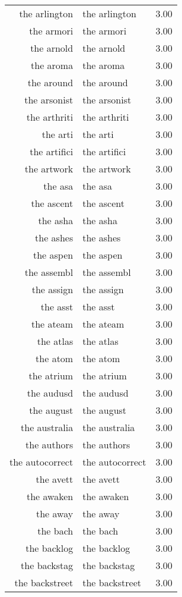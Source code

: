 \begin{table}[ht]
\begin{tabular}{rlr}
  the arlington & the arlington & 3.00 \\ 
  the armori & the armori & 3.00 \\ 
  the arnold & the arnold & 3.00 \\ 
  the aroma & the aroma & 3.00 \\ 
  the around & the around & 3.00 \\ 
  the arsonist & the arsonist & 3.00 \\ 
  the arthriti & the arthriti & 3.00 \\ 
  the arti & the arti & 3.00 \\ 
  the artifici & the artifici & 3.00 \\ 
  the artwork & the artwork & 3.00 \\ 
  the asa & the asa & 3.00 \\ 
  the ascent & the ascent & 3.00 \\ 
  the asha & the asha & 3.00 \\ 
  the ashes & the ashes & 3.00 \\ 
  the aspen & the aspen & 3.00 \\ 
  the assembl & the assembl & 3.00 \\ 
  the assign & the assign & 3.00 \\ 
  the asst & the asst & 3.00 \\ 
  the ateam & the ateam & 3.00 \\ 
  the atlas & the atlas & 3.00 \\ 
  the atom & the atom & 3.00 \\ 
  the atrium & the atrium & 3.00 \\ 
  the audusd & the audusd & 3.00 \\ 
  the august & the august & 3.00 \\ 
  the australia & the australia & 3.00 \\ 
  the authors & the authors & 3.00 \\ 
  the autocorrect & the autocorrect & 3.00 \\ 
  the avett & the avett & 3.00 \\ 
  the awaken & the awaken & 3.00 \\ 
  the away & the away & 3.00 \\ 
  the bach & the bach & 3.00 \\ 
  the backlog & the backlog & 3.00 \\ 
  the backstag & the backstag & 3.00 \\ 
  the backstreet & the backstreet & 3.00 \\ 

\end{tabular}
\end{table}
